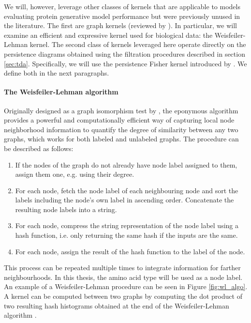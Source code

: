 We will, however, leverage other classes of kernels that are applicable to
models evaluating protein generative model performance but were previously
unused in the literature. The first are graph kernels (reviewed by
\cite{borgwardt2020graph}). In particular, we will examine an efficient and
expressive kernel used for biological data: the Weisfeiler-Lehman kernel. The
second class of kernels leveraged here operate directly on the persistence
diagrams obtained using the filtration procedures described in section
\ref{sec:tda}. Specifically, we will use the persistence Fisher kernel introduced by
\cite{le2018persistence}. We define both in the next paragraphs.

\paragraph{The Weisfeiler-Lehman algorithm} Originally designed as a graph
isomorphism test by \cite{weisfeiler1968reduction}, the eponymous
algorithm provides a powerful and computationally efficient way of capturing
local node neighborhood information to quantify the degree of similarity between
any two graphs, which works for both labeled and unlabeled graphs. The procedure
can be described as follows:
\begin{enumerate}
\item If the nodes of the graph do not already have node label assigned to them,
  assign them one, e.g. using their degree.
\item For each node, fetch the node label of each neighbouring node and sort the
  labels including the node's own label in ascending order. Concatenate the
  resulting node labels into a string.
\item For each node, compress the string representation of the node label using
  a hash function, i.e. only returning the same hash if the inputs are the same.
\item For each node, assign the result of the hash function to the label of the node.
\end{enumerate}
This process can be repeated multiple times to integrate information for farther
neighbourhoods. In this thesis, the amino acid type will be used as a node
label. An example of a Weisfeiler-Lehman procedure can be seen in Figure
\ref{fig:wl_algo}. A kernel can be computed between two graphs by computing the
dot product of two resulting hash histograms obtained at the end of the
Weisfeiler-Lehman algorithm \citep{shervashidze2011weisfeiler}.

